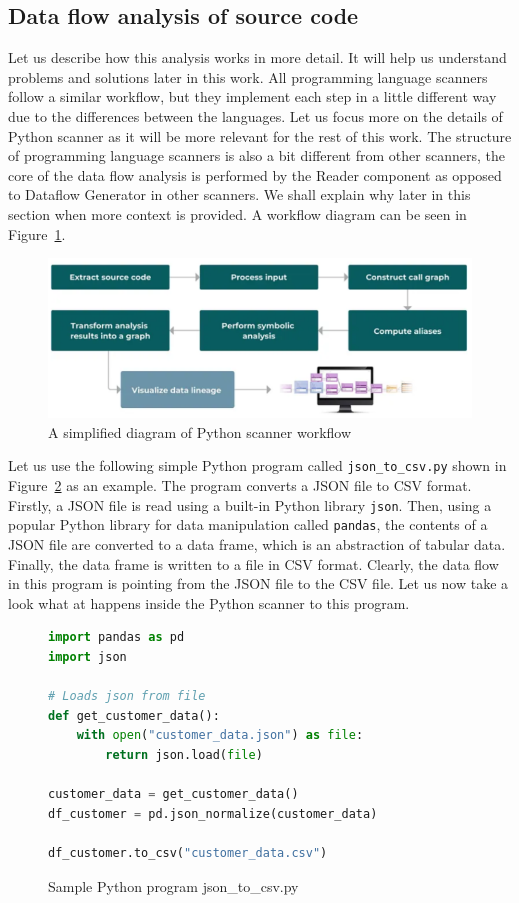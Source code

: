 \subsection{Data flow analysis of source code}

Let us describe how this analysis works in more detail. It will help us understand problems and solutions later in this work. All programming language scanners follow a similar workflow, but they implement each step in a little different way due to the differences between the languages. Let us focus more on the details of Python scanner as it will be more relevant for the rest of this work. The structure of programming language scanners is also a bit different from other scanners, the core of the data flow analysis is performed by the Reader component as opposed to Dataflow Generator in other scanners. We shall explain why later in this section when more context is provided. A workflow diagram can be seen in Figure~\ref{fig02:pythonWorkflow}.

\begin{figure}[ht]\centering
\includegraphics[width=1.0\textwidth]{img/python_workflow.PNG}
\caption{A simplified diagram of Python scanner workflow}
\label{fig02:pythonWorkflow}
\end{figure}  

Let us use the following simple Python program called \texttt{json\_to\_csv.py} shown in Figure~\ref{fig:pythonSample} as an example. The program converts a JSON file to CSV format. Firstly, a JSON file is read using a built-in Python library \texttt{json}. Then, using a popular Python library for data manipulation called \texttt{pandas}, the contents of a JSON file are converted to a data frame, which is an abstraction of tabular data. Finally, the data frame is written to a file in CSV format. Clearly, the data flow in this program is pointing from the JSON file to the CSV file. Let us now take a look what at happens inside the Python scanner to this program.

\begin{figure}[ht]
\begin{lstlisting}[language=Python] 
import pandas as pd
import json

# Loads json from file
def get_customer_data():
    with open("customer_data.json") as file:
        return json.load(file)

customer_data = get_customer_data()
df_customer = pd.json_normalize(customer_data)

df_customer.to_csv("customer_data.csv")
\end{lstlisting}
\caption{Sample Python program json\_to\_csv.py}
\label{fig:pythonSample}
\end{figure}


